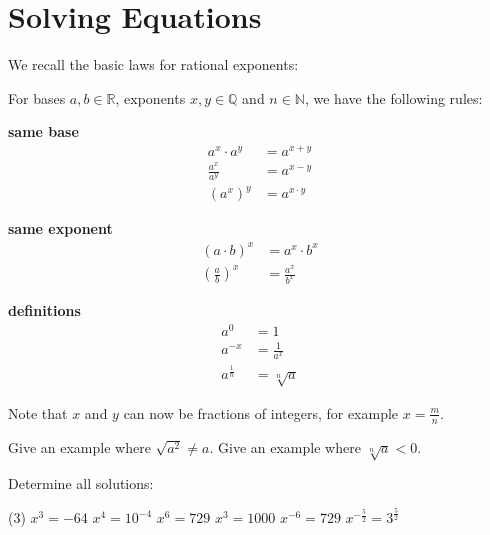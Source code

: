 \section{Solving Equations}
We recall the basic laws for rational exponents:
\begin{tcolorbox}
	For bases $a,b\in\mathbb R$, exponents $x,y\in\mathbb Q$ and $n\in\mathbb N$, we have the following rules:
	\begin{multicols}{3}
		\centering
		\textbf{same base}\\
		\begin{align*}
			a^x\cdot a^y&=a^{x+y} \\[8pt]
			\frac{a^x}{a^y}&=a^{x-y} \\[8pt]
			\left(a^x\right)^y&=a^{x\cdot y}
		\end{align*}
		\vfill
		\columnbreak
		
		\textbf{same exponent}\\
		\begin{align*}
			\left(a\cdot b\right)^x&=a^x\cdot b^x \\[8pt]
			\left(\frac{a}{b}\right)^x&=\frac{a^x}{b^x}
		\end{align*}
		\vfill
		\columnbreak
		
		\textbf{definitions}\\
		\begin{align*}
			a^0&=1 \\[8pt]
			a^{-x}&=\frac{1}{a^x} \\[8pt]
			a^{\frac{1}{n}}&=\sqrt[n]{a}
		\end{align*}
		\vfill
	\end{multicols}
	Note that $x$ and $y$ can now be fractions of integers, for example $x=\frac{m}{n}$.
\end{tcolorbox}
\begin{exercise}
	\begin{tasks}
		\task Give an example where $\sqrt{a^2}\neq a$.
		\task Give an example where $\sqrt[n]{a}<0$.
	\end{tasks}
\end{exercise}
\begin{exercise}
	Determine all solutions:
	\begin{tasks}(3)
		\task $x^3=-64$
		\task $x^4=10^{-4}$
		\task $x^6=729$
		\task $x^3=1000$
		\task $x^{-6}=729$
		\task $x^{-\frac{5}{2}}=3^{\frac{5}{2}}$
	\end{tasks}
\end{exercise}

